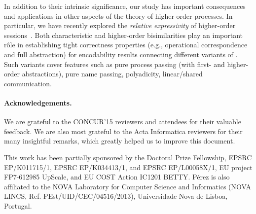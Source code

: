 In addition to their intrinsic significance, our study 
has important consequences and applications in other aspects of the theory of higher-order   processes. 
In particular,  we have recently explored the \emph{relative expressivity}
of higher-order sessions~\cite{DBLP:conf/esop/KouzapasPY16}.  
 Both characteristic and higher-order bisimilarities play an important r\^{o}le in establishing 
 tight correctness properties (e.g., operational correspondence and full abstraction) for encodability results connecting different variants of \HOp.
 Such variants cover
 features such as 
 pure process passing (with first- and higher-order abstractions), pure name passing, polyadicity, linear/shared communication. 

\paragraph{Acknowledgements.} 
We are grateful to the CONCUR'15 reviewers and attendees 
for their valuable feedback.
We are also most grateful to the Acta Informatica reviewers for their many insightful remarks, which greatly helped us to improve  this document.

This work has been partially sponsored by the Doctoral Prize Fellowship, EPSRC EP/K011715/1, EPSRC EP/K034413/1, and EPSRC EP/L00058X/1, EU project FP7-612985 UpScale, and EU COST Action IC1201 BETTY. P\'{e}rez is also affiliated to the NOVA Laboratory for Computer Science and Informatics (NOVA LINCS, Ref. PEst/UID/CEC/04516/2013), Universidade Nova de Lisboa, Portugal.

